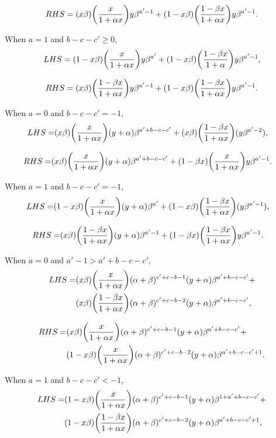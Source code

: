 \documentclass[ALCO, Unicode]{cedram}
\DeclarePairedDelimiter\autobracket{(}{)}
\newcommand{\br}[1]{\autobracket*{#1}}
\begin{document}
\[
RHS=(x\beta)\br{\dfrac{x}{1+\alpha x}}y\beta^{a'-1}+(1-x\beta)\br{\dfrac{1-\beta x}{1+\alpha x}}y\beta^{a'-1}.
\]

When $a=1$ and $b-c-c'\geq 0$,
\[
LHS=(1-x\beta)\br{\dfrac{x}{1+\alpha x}}y\beta^{a'}+(1-x\beta)\br{\dfrac{1-\beta x}{1+\alpha}}y\beta^{a'-1},
\]

\[
RHS=(x\beta)\br{\dfrac{1-\beta x}{1+\alpha x}}y\beta^{a'-1}+(1-x\beta)\br{\dfrac{1-\beta x}{1+\alpha x}}y\beta^{a'-1}.
\]

When $a=0$ and $b-c-c'=-1$,
\begin{align*}
LHS=&(x\beta)\br{\dfrac{x}{1+\alpha x}} (y+\alpha)\beta^{a'+b-c-c'} +
 (x\beta)\br{\dfrac{1-\beta x}{1+\alpha x}}(y\beta^{a'-2}),
\end{align*}

\begin{align*}
RHS=&(x\beta) \br{\dfrac{x}{1+\alpha x}}(y+\alpha)\beta^{a'+b-c-c'}+
(1-\beta x)\br{\dfrac{x}{1+\alpha x}}y\beta^{a'-1}.
\end{align*}


When $a=1$ and $b-c-c'=-1$,
\begin{align*}
LHS=&(1-x\beta)\br{\dfrac{x}{1+\alpha x}} (y+\alpha)\beta^{a'} +
 (1-x\beta)\br{\dfrac{1-\beta x}{1+\alpha x}}(y\beta^{a'-1}),
\end{align*}

\begin{align*}
RHS=&(x\beta) \br{\dfrac{1-\beta x}{1+\alpha x}}(y+\alpha)\beta^{a'-1}+
(1-\beta x)\br{\dfrac{1-\beta x}{1+\alpha x}}y\beta^{a'-1}.
\end{align*}

When $a=0$ and $a'-1 > a'+b-c-c'$,
\begin{align*}
LHS=&(x\beta)\br{\dfrac{x}{1+\alpha x}}(\alpha+\beta)^{c'+c-b-1}(y+\alpha)\beta^{a'+b-c-c'}+\\&(x\beta)\br{\dfrac{1-\beta x }{1+\alpha x}}(\alpha+\beta)^{c'+c-b-2}(y+\alpha)\beta^{a'+b-c-c'},
\end{align*}


\begin{align*}
RHS=&(x\beta)\br{\dfrac{x}{1+\alpha x}}(\alpha+\beta)^{c'+c-b-1}(y+\alpha)\beta^{a'+b-c-c'}+\\ &(1-x\beta)\br{\dfrac{x}{1+\alpha x}}(\alpha+\beta)^{c'+c-b-2}(y+\alpha)\beta^{a'+b-c-c'+1}.
\end{align*}


When $a=1$ and $b-c-c'<-1$,
\begin{align*}
LHS=&(1-x\beta)\br{\dfrac{x}{1+\alpha x}}(\alpha+\beta)^{c'+c-b-1}(y+\alpha)\beta^{1+a'+b-c-c'}+\\&(1-x\beta)\br{\dfrac{1-\beta x }{1+\alpha x}}(\alpha+\beta)^{c'+c-b-2}(y+\alpha)\beta^{a'+b-c-c'+1},
\end{align*}
\end{document}
